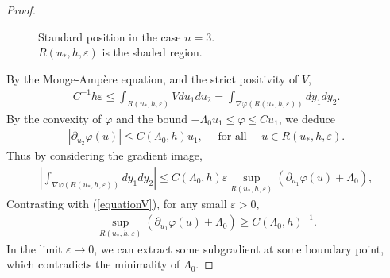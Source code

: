 \documentclass[10pt,a4paper]{amsart}
\begin{document}
\begin{proof}
\begin{figure}[H]
    \centering
    \caption{Standard position in the case $n=3$.\\ $R(u_*,h, \varepsilon)$ is the shaded region.}
    \label{rectangle}
    \end{figure}
By the Monge-Amp\`ere equation, and the strict positivity of $V$,
\begin{align}\label{equationV}
  C^{-1}h\varepsilon  \leq \int_{R(u_*,h, \varepsilon)} V du_1 du_2 = \int_{\nabla \varphi(R(u_*,h, \varepsilon))} dy_1 dy_2.
\end{align}
By the convexity of $\varphi$ and the bound $-\Lambda_0 u_1\leq \varphi\leq Cu_1$, we deduce
\begin{align*}
    |\partial_{u_2} \varphi(u) | \leq C (\Lambda_0,h) u_1, \quad \text{ for all } \quad u \in R(u_*,h, \varepsilon).
\end{align*}
Thus by considering the gradient image,
\begin{align*}
    |\int_{\nabla \varphi(R(u_*,h, \varepsilon))} dy_1 dy_2| \leq C( \Lambda_0, h )\varepsilon  \sup_{ R(u_*,h, \varepsilon) }(\partial_{u_1} \varphi(u) + \Lambda_0),
\end{align*}
Contrasting with (\ref{equationV}), for any small $\varepsilon>0$,
\begin{align*}
   \sup_{ R(u_*,h, \varepsilon) }(\partial_{u_1} \varphi(u) + \Lambda_0)  \geq C(\Lambda_0, h)^{-1}.
\end{align*}
In the limit $\varepsilon\to 0$, we can extract some subgradient at some boundary point, which contradicts the minimality of $\Lambda_0$.
\end{proof}
\end{document}
